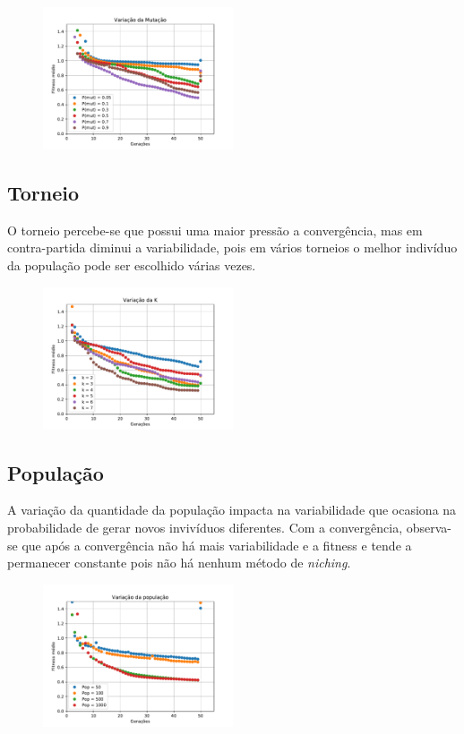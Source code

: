\begin{figure}[H]
  \centering
  \includegraphics[width=0.5\textwidth]{pdf/varmutation.pdf}
  \label{fig:varmut}
\end{figure}

\subsection{Torneio}

O torneio percebe-se que possui uma maior pressão a convergência, mas em contra-partida diminui a variabilidade, pois em vários torneios o melhor indivíduo da população pode ser escolhido várias vezes.

\begin{figure}[H]
  \centering
  \includegraphics[width=0.5\textwidth]{pdf/varK.pdf}
  \label{fig:vark}
\end{figure}

\subsection{População}

A variação da quantidade da população impacta na variabilidade que ocasiona na probabilidade de gerar novos invivíduos diferentes. Com a convergência, observa-se que após a convergência não há mais variabilidade e a fitness e tende a permanecer constante pois não há nenhum método de \textit{niching}.

\begin{figure}[H]
  \centering
  \includegraphics[width=0.5\textwidth]{pdf/populations.pdf}
  \label{fig:varpop}
\end{figure}




